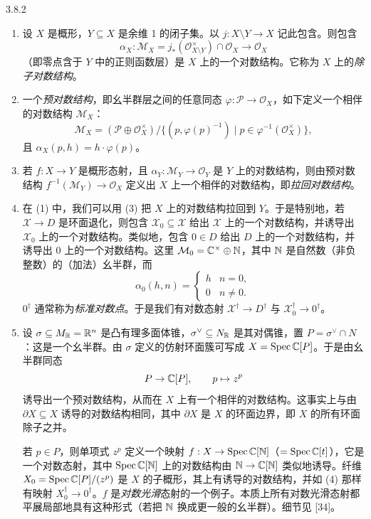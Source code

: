 \begin{example}{3.8.2}
\begin{enumerate}[label=(\arabic*)]
\item 设 $X$ 是概形，$Y\subseteq X$ 是余维 1 的闭子集。以 $j:X\setminus Y\to X$ 记此包含。则包含
\[
\alpha_X:\mathcal M_X=j_*(\mathcal O_{X\setminus Y}^\times)\cap\mathcal O_X\to\mathcal O_X
\]
（即零点含于 $Y$ 中的正则函数层）是 $X$ 上的一个对数结构。它称为 $X$ 上的\emph{除子对数结构}。
\item 一个\emph{预对数结构}，即幺半群层之间的任意同态 $\varphi:\mathcal P\to\mathcal O_X$，如下定义一个相伴的对数结构 $\mathcal M_X$：
\[
\mathcal M_X=(\mathcal P\oplus\mathcal O_X^\times)/\{(p,\varphi(p)^{-1})\mid p\in\varphi^{-1}(\mathcal O_X^\times)\},
\]
且 $\alpha_X(p,h)=h\cdot\varphi(p)$。
\item 若 $f:X\to Y$ 是概形态射，且 $\alpha_Y:\mathcal M_Y\to\mathcal O_Y$ 是 $Y$ 上的对数结构，则由预对数结构 $f^{-1}(\mathcal M_Y)\to\mathcal O_X$ 定义出 $X$ 上一个相伴的对数结构，即\emph{拉回对数结构}。
\item 在 (1) 中，我们可以用 (3) 把 $X$ 上的对数结构拉回到 $Y$。于是特别地，若 $\mathcal X\to D$ 是环面退化，则包含 $\mathcal X_0\subseteq\mathcal X$ 给出 $\mathcal X$ 上的一个对数结构，并诱导出 $\mathcal X_0$ 上的一个对数结构。类似地，包含 $0\in D$ 给出 $D$ 上的一个对数结构，并诱导出 $0$ 上的一个对数结构。这里 $\mathcal M_0=\mathbb{C}^\times\oplus\mathbb{N}$，其中 $\mathbb{N}$ 是自然数（非负整数）的（加法）幺半群，而
\[
\alpha_0(h,n)=\begin{cases} h & n=0,\\ 0 & n\ne0.\end{cases}
\]
$0^\dagger$ 通常称为\emph{标准对数点}。于是我们有对数态射 $\mathcal X^\dagger\to D^\dagger$ 与 $\mathcal X_0^\dagger\to 0^\dagger$。
\item 设 $\sigma\subseteq M_{\mathbb{R}}=\mathbb{R}^n$ 是凸有理多面体锥，$\sigma^\vee\subseteq N_{\mathbb{R}}$ 是其对偶锥，置 $P=\sigma^\vee\cap N$：这是一个幺半群。由 $\sigma$ 定义的仿射环面簇可写成 $X=\operatorname{Spec}\mathbb{C}[P]$。于是由幺半群同态
\[
P\to\mathbb{C}[P],\qquad p\mapsto z^p
\]
诱导出一个预对数结构，从而在 $X$ 上有一个相伴的对数结构。这事实上与由 $\partial X\subseteq X$ 诱导的对数结构相同，其中 $\partial X$ 是 $X$ 的环面边界，即 $X$ 的所有环面除子之并。

若 $p\in P$，则单项式 $z^p$ 定义一个映射 $f:X\to\operatorname{Spec}\mathbb{C}[\mathbb{N}]$（$=\operatorname{Spec}\mathbb{C}[t]$），它是一个对数态射，其中 $\operatorname{Spec}\mathbb{C}[\mathbb{N}]$ 上的对数结构由 $\mathbb{N}\to\mathbb{C}[\mathbb{N}]$ 类似地诱导。纤维 $X_0=\operatorname{Spec}\mathbb{C}[P]/(z^p)$ 是 $X$ 的子概形，其上有诱导的对数结构，并如 (4) 那样有映射 $X_0^\dagger\to0^\dagger$。$f$ 是\emph{对数光滑}态射的一个例子。本质上所有对数光滑态射都平展局部地具有这种形式（若把 $\mathbb{N}$ 换成更一般的幺半群）。细节见 [34]。
\end{enumerate}


\end{example}
